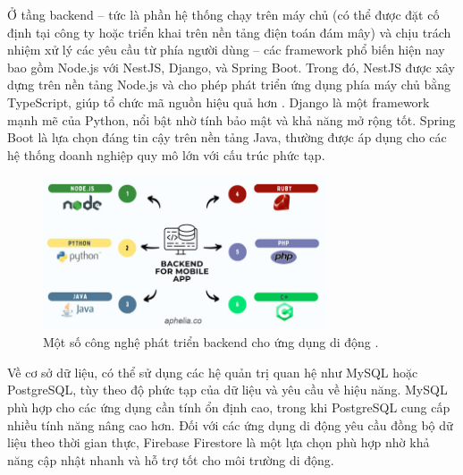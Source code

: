     \vspace{0.5em}
    
    Ở tầng backend – tức là phần hệ thống chạy trên máy chủ (có thể được đặt cố định tại công ty hoặc triển khai trên nền tảng điện toán đám mây) và chịu trách nhiệm xử lý các yêu cầu từ phía người dùng – các framework phổ biến hiện nay bao gồm Node.js với NestJS, Django, và Spring Boot. Trong đó, NestJS được xây dựng trên nền tảng Node.js và cho phép phát triển ứng dụng phía máy chủ bằng TypeScript, giúp tổ chức mã nguồn hiệu quả hơn \cite{backendframeworks}. Django là một framework mạnh mẽ của Python, nổi bật nhờ tính bảo mật và khả năng mở rộng tốt. Spring Boot là lựa chọn đáng tin cậy trên nền tảng Java, thường được áp dụng cho các hệ thống doanh nghiệp quy mô lớn với cấu trúc phức tạp.
    
    \vspace{0.5em}
      

      \begin{figure}[H]
        \centering
        \includegraphics[width=0.75\textwidth]{images/backend_for_mobile_app.jpg}
        \caption{Một số công nghệ phát triển backend cho ứng dụng di động \cite{aphelia2023}.}
        \label{fig:fig1}
      \end{figure}
        \vspace{0.5em}
      
        Về cơ sở dữ liệu, có thể sử dụng các hệ quản trị quan hệ như MySQL hoặc PostgreSQL, tùy theo độ phức tạp của dữ liệu và yêu cầu về hiệu năng. MySQL phù hợp cho các ứng dụng cần tính ổn định cao, trong khi PostgreSQL cung cấp nhiều tính năng nâng cao hơn. Đối với các ứng dụng di động yêu cầu đồng bộ dữ liệu theo thời gian thực, Firebase Firestore là một lựa chọn phù hợp nhờ khả năng cập nhật nhanh và hỗ trợ tốt cho môi trường di động.
      
        \vspace{0.5em}
      

